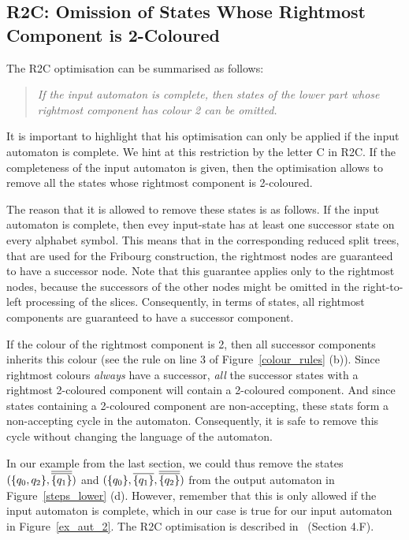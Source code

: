 \subsection{R2C: Omission of States Whose Rightmost Component is 2-Coloured}

The R2C optimisation can be summarised as follows:

\begin{quote}
\centering
\textit{If the input automaton is complete, then states of the lower part whose rightmost component has colour 2 can be omitted.}
\end{quote}

It is important to highlight that his optimisation can only be applied if the input automaton is complete. We hint at this restriction by the letter C in R2C. If the completeness of the input automaton is given, then the optimisation allows to remove all the states whose rightmost component is 2-coloured. 

The reason that it is allowed to remove these states is as follows. If the input automaton is complete, then evey input-state has at least one successor state on every alphabet symbol. This means that in the corresponding reduced split trees, that are used for the Fribourg construction, the rightmost nodes are guaranteed to have a successor node. Note that this guarantee applies only to the rightmost nodes, because the successors of the other nodes might be omitted in the right-to-left processing of the slices. Consequently, in terms of states, all rightmost components are guaranteed to have a successor component. 

If the colour of the rightmost component is 2, then all successor components inherits this colour (see the rule on line 3 of Figure~\ref{colour_rules} (b)). Since rightmost colours \textit{always} have a successor, \textit{all} the successor states with a rightmost 2-coloured component will contain a 2-coloured component. And since states containing a 2-coloured component are non-accepting, these stats form a non-accepting cycle in the automaton. Consequently, it is safe to remove this cycle without changing the language of the automaton.

In our example from the last section, we could thus remove the states $(\qqm02, \cl2{\qm1})$ and $(\qm0, \cl1{\qm1}, \cl2{\qm2})$ from the output automaton in Figure~\ref{steps_lower} (d). However, remember that this is only allowed if the input automaton is complete, which in our case is true for our input automaton in Figure~\ref{ex_aut_2}. The R2C optimisation is described in~\cite{2014_joel_ulrich} (Section 4.F).


